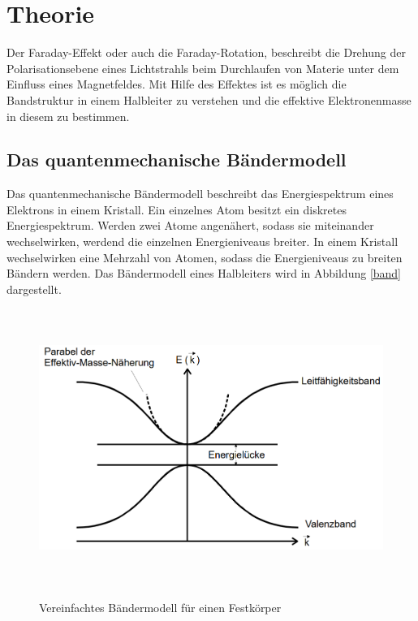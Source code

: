 \section{Theorie}
Der Faraday-Effekt oder auch die Faraday-Rotation, beschreibt die Drehung der
Polarisationsebene eines Lichtstrahls beim Durchlaufen von Materie unter dem
Einfluss eines Magnetfeldes. Mit Hilfe des Effektes ist es möglich die
Bandstruktur in einem Halbleiter zu verstehen und die effektive Elektronenmasse
in diesem zu bestimmen.

\subsection{Das quantenmechanische Bändermodell}
Das quantenmechanische Bändermodell beschreibt das Energiespektrum eines
Elektrons in einem Kristall. Ein einzelnes Atom besitzt ein diskretes
Energiespektrum. Werden zwei Atome angenähert, sodass sie miteinander
wechselwirken, werdend die einzelnen Energieniveaus breiter. In einem Kristall
wechselwirken eine Mehrzahl von Atomen, sodass die Energieniveaus zu breiten
Bändern werden. Das Bändermodell eines Halbleiters wird in Abbildung \ref{band}
dargestellt.

\begin{figure}[H]
  \centering
  \includegraphics[width=\textwidth, height=9cm]{bandmodel.png}
  \caption{Vereinfachtes Bändermodell für einen Festkörper}
  \label{fig:band}
  \cite{skript}
\end{figure}

